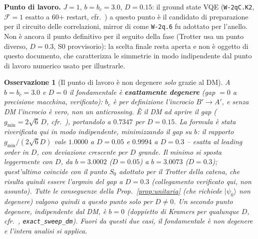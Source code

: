 \documentclass[11pt,a4paper]{article}
\newtheorem{osservazione}{Osservazione}
\begin{document}
\textbf{Punto di lavoro.} $J{=}1,\,b{=}b_c{=}3.0,\,D{=}0.15$: il ground state VQE
(\texttt{W-2qC.K2}, $\mathcal F=1$ esatto a $60$+ restart, cfr.\
\texttt{}) a questo punto è il candidato di preparazione
per il circuito delle correlazioni, mirror di come \texttt{W-2q.6} fu adottato per l'anello. Non
è ancora il punto definitivo per il seguito della fase (Trotter usa un punto diverso, $D=0.3$,
S0 provvisorio): la scelta finale resta aperta e non è oggetto di questo documento, che
caratterizza le simmetrie in modo indipendente dal punto di lavoro numerico usato per illustrarle.

\begin{osservazione}[Il punto di lavoro è non degenere \emph{solo} grazie al DM]
\label{oss:degenerazione}
A $b=b_c=3.0$ e $D=0$ il fondamentale è \textbf{esattamente degenere} (gap $=0$ a precisione
macchina, verificato): $b_c$ è per definizione l'incrocio $B'\to A'$, e senza DM l'incrocio è
vero, non un anticrossing. È il DM ad aprire il gap ($g_{\min}=2\sqrt6\,D$, cfr.\
\texttt{}), portandolo a $0.7347$ per $D=0.15$. La
formula è stata riverificata qui in modo indipendente, minimizzando il gap su $b$: il rapporto
$g_{\min}/(2\sqrt6 D)$ vale $1.0000$ a $D=0.05$ e $0.9994$ a $D=0.3$ -- esatta al leading order
in $D$, con deviazione crescente per $D$ grande. Il minimo si sposta leggermente con $D$, da
$b=3.0002$ ($D{=}0.05$) a $b=3.0073$ ($D{=}0.3$); quest'ultimo coincide con il punto $S_0$
adottato per il Trotter della catena, che risulta quindi essere l'argmin del gap a $D=0.3$
(collegamento verificato qui, non assunto). Tutte
le conseguenze della Prop.~\ref{prop:unitaria} (che richiede $|\psi_0\rangle$ \emph{non} degenere)
valgono quindi a questo punto solo per $D\neq0$. Un secondo punto degenere, indipendente dal DM,
è $b=0$ (doppietto di Kramers per qualunque $D$, cfr.\ \texttt{\seqsplit{trimer\_chain\_exact.py}},
\texttt{exact\_sweep\_dm}). Fuori da questi due casi, il fondamentale è non degenere e l'intera
analisi si applica.
\end{osservazione}
\end{document}
